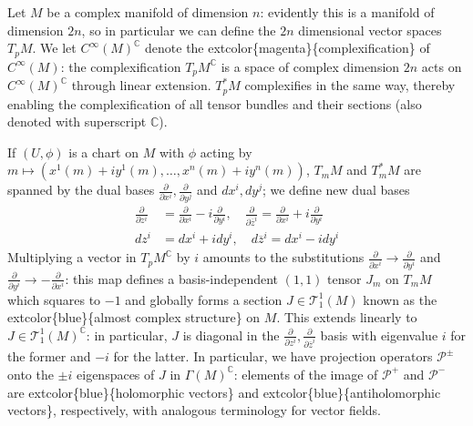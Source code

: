 \documentclass[
]{book}
\begin{document}
Let \(M\) be a complex manifold of dimension \(n\): evidently this is a manifold of dimension \(2n\), so in particular we can define the \(2n\) dimensional vector spaces \(T_p M\).
We let \(C^\infty (M)^{\mathbb{C}}\) denote the extcolor\{magenta\}\{complexification\} of \(C^\infty(M)\): the complexification \(T_p M^{\mathbb{C}}\) is a space of complex dimension \(2n\) acts on \(C^\infty(M)^{\mathbb{C}}\) through linear extension.
\(T_p^* M\) complexifies in the same way, thereby enabling the complexification of all tensor bundles and their sections (also denoted with superscript \(\mathbb{C}\)).

If \((U,\phi)\) is a chart on \(M\) with \(\phi\) acting by \(m \mapsto (x^1(m) + iy^1(m), \dots, x^n(m) + iy^n(m))\), \(T_m M\) and \(T_m^* M\) are spanned by the dual bases \(\frac{\partial}{\partial x^i}, \frac{\partial}{\partial y^j}\) and \(dx^i, dy^j\); we define new dual bases
\begin{equation}
    \begin{aligned}
        \frac{\partial}{\partial z^i} &= \frac{\partial}{\partial x^i} - i\frac{\partial}{\partial y^i}, \quad 
        \frac{\partial}{\partial \overline{z}^i} = \frac{\partial}{\partial x^i} + i\frac{\partial}{\partial y^i} \\
        dz^i &= dx^i + idy^i, \quad d\overline{z}^i = dx^i - idy^i
    \end{aligned}
\end{equation}
Multiplying a vector in \(T_p M^{\mathbb{C}}\) by \(i\) amounts to the substitutions \(\tfrac{\partial}{\partial x^i} \to \tfrac{\partial}{\partial y^i}\) and \(\tfrac{\partial}{\partial y^i} \to -\tfrac{\partial}{\partial x^i}\): this map defines a basis-independent \((1,1)\) tensor \(J_m\) on \(T_m M\) which squares to \(-1\) and globally forms a section \(J \in \mathcal{T}^1_1(M)\) known as the extcolor\{blue\}\{almost complex structure\} on \(M\).
This extends linearly to \(J \in \mathcal{T}^1_1(M)^{\mathbb{C}}\): in particular, \(J\) is diagonal in the \(\frac{\partial}{\partial z^i}, \frac{\partial}{\partial \overline{z}^i}\) basis with eigenvalue \(i\) for the former and \(-i\) for the latter.
In particular, we have projection operators \(\mathcal{P}^\pm\) onto the \(\pm i\) eigenspaces of \(J\) in \(\Gamma(M)^{\mathbb{C}}\): elements of the image of \(\mathcal{P}^+\) and \(\mathcal{P}^-\) are extcolor\{blue\}\{holomorphic vectors\} and extcolor\{blue\}\{antiholomorphic vectors\}, respectively, with analogous terminology for vector fields.
\end{document}
